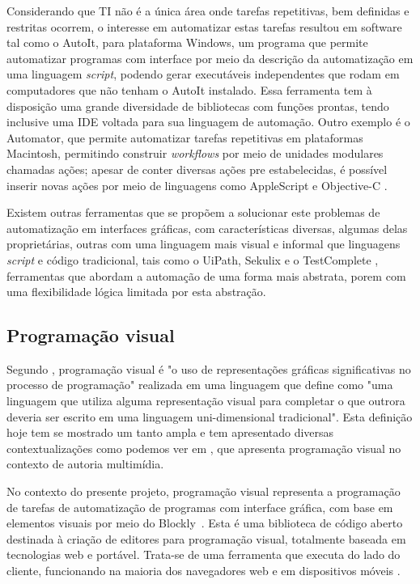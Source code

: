 \documentclass[tg]{mdtufsm}
\begin{document}
	Considerando que TI não é a única área onde tarefas repetitivas, bem definidas e restritas ocorrem, o interesse em automatizar estas tarefas resultou em software tal como o AutoIt\cite{autoit}, para plataforma Windows, um programa que permite automatizar programas com interface por meio da descrição da automatização em uma linguagem \emph{script}, podendo gerar executáveis independentes que rodam em computadores que não tenham o AutoIt instalado. Essa ferramenta tem à disposição uma grande diversidade de bibliotecas com funções prontas, tendo inclusive uma IDE voltada para sua linguagem de automação. Outro exemplo é o Automator, que permite automatizar tarefas repetitivas em plataformas Macintosh, permitindo construir \emph{workflows} por meio de unidades modulares chamadas ações; apesar de conter diversas ações pre estabelecidas, é possível inserir novas ações por meio de linguagens como AppleScript e Objective-C \cite{automator}.

	Existem outras ferramentas que se propõem a solucionar este problemas de automatização em interfaces gráficas, com características diversas, algumas delas proprietárias, outras com uma linguagem mais visual e informal que linguagens \emph{script} e código tradicional, tais como o UiPath, Sekulix e o TestComplete \cite{uipath,testcomplete,sikuli}, ferramentas que abordam a automação de uma forma mais abstrata, porem com uma flexibilidade lógica limitada por esta abstração.


	\subsection{Programação visual}

	Segundo \citeauthor{visualProgram}\cite{visualProgram}, programação visual é "o uso de representações gráficas significativas no processo de programação" realizada em uma linguagem que \citeauthor{visualProgram} define como "uma linguagem que utiliza alguma representação visual para completar o que outrora deveria ser escrito em uma linguagem uni-dimensional tradicional". Esta definição hoje tem se mostrado um tanto ampla e tem apresentado diversas contextualizações como podemos ver em \cite{visualProgAuth}, que apresenta programação visual no contexto de autoria multimídia.

	No contexto do presente projeto, programação visual representa a programação de tarefas de automatização de programas com interface gráfica, com base em elementos visuais por meio do Blockly~\cite{blocklyResource}. Esta é uma biblioteca de código aberto destinada à criação de editores para programação visual, totalmente baseada em tecnologias web e portável. Trata-se de uma ferramenta que executa do lado do cliente, funcionando na maioria dos navegadores web e em dispositivos móveis \cite{blocklyResource}.
\end{document}

